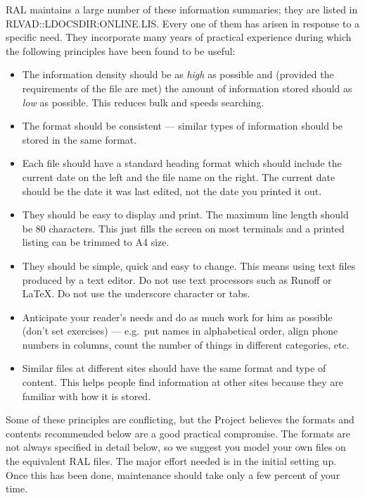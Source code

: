 RAL maintains a large number of these information summaries; they are listed in
RLVAD::\-LDOCS\-DIR:\-ONLINE.\-LIS.
Every one of them has arisen in response to a specific need.
They incorporate many years of practical experience during which the following
principles have been found to be useful:
\begin{itemize}
\item The information density should be as {\em high} as possible and
(provided the
requirements of the file are met) the amount of information stored should as
{\em low} as possible.
This reduces bulk and speeds searching.
\item The format should be consistent --- similar types of information should be
stored in the same format.
\item Each file should have a standard heading format which should include the
current date on the left and the file name on the right.
The current date should be the date it was last edited, not the date you printed
it out.
\item They should be easy to display and print.
The maximum line length should be 80 characters.
This just fills the screen on most terminals and a printed listing can be
trimmed to A4 size.
\item They should be simple, quick and easy to change.
This means using text files produced by a text editor.
Do not use text processors such as Runoff or \LaTeX.
Do not use the underscore character or tabs.
\item Anticipate your reader's needs and do as much work for him as possible
(don't set exercises) --- e.g.\ put names in alphabetical order, align phone
numbers in columns, count the number of things in different categories, etc.
\item Similar files at different sites should have the same format and type of
content.
This helps people find information at other sites because they are familiar with
how it is stored.
\end{itemize}
Some of these principles are conflicting, but the Project believes the formats
and contents recommended below are a good practical compromise.
The formats are not always specified in detail below, so we suggest you model
your own files on the equivalent RAL files.
The major effort needed is in the initial setting up.
Once this has been done, maintenance should take only a few percent of your
time.

